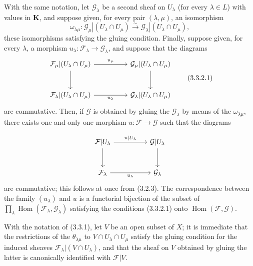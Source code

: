 \begin{env}[3.3.2]
\label{0.3.3.2}
With the same notation, let $\mathcal{G}_\lambda$ be a second sheaf on
$U_\lambda$ (for every $\lambda\in L$) with values in $\mathbf{K}$, and suppose
given, for every pair $(\lambda,\mu)$, an isomorphism
\[
  \omega_{\lambda\mu}:
  \mathcal{G}_\mu|(U_\lambda\cap U_\mu)
  \xrightarrow{\sim}
  \mathcal{G}_\lambda|(U_\lambda\cap U_\mu),
\]
these isomorphisms satisfying the gluing condition. Finally, suppose given,
for every $\lambda$, a morphism
$u_\lambda:\mathcal{F}_\lambda\to\mathcal{G}_\lambda$, and suppose that the diagrams
\begin{equation}
\begin{tikzcd}[column sep=huge,row sep=large]
\mathcal{F}_\mu|(U_\lambda\cap U_\mu)
  \arrow[r,"u_\mu"] \arrow[d]
  & \mathcal{G}_\mu|(U_\lambda\cap U_\mu) \arrow[d] \\
\mathcal{F}_\lambda|(U_\lambda\cap U_\mu)
  \arrow[r,"u_\lambda"']
  & \mathcal{G}_\lambda|(U_\lambda\cap U_\mu)
\end{tikzcd}
\tag{3.3.2.1}\label{0.3.3.2.1}
\end{equation}
are commutative. Then, if $\mathcal{G}$ is obtained by gluing the
$\mathcal{G}_\lambda$ by means of the $\omega_{\lambda\mu}$, there exists one and only one
morphism $u:\mathcal{F}\to\mathcal{G}$ such that the diagrams


\[
\begin{tikzcd}[column sep=huge,row sep=large]
\mathcal{F}|U_\lambda
  \arrow[r,"u|U_\lambda"] \arrow[d]
  & \mathcal{G}|U_\lambda \arrow[d] \\
\mathcal{F}_\lambda
  \arrow[r,"u_\lambda"']
  & \mathcal{G}_\lambda
\end{tikzcd}
\]
are commutative; this follows at once from (3.2.3). The correspondence between
the family $(u_\lambda)$ and $u$ is a functorial bijection of the subset of
$\prod_\lambda\operatorname{Hom}(\mathcal{F}_\lambda,\mathcal{G}_\lambda)$
satisfying the conditions (3.3.2.1) onto
$\operatorname{Hom}(\mathcal{F},\mathcal{G})$.
\end{env}

\begin{env}[3.3.3]
\label{0.3.3.3}
With the notation of (3.3.1), let $V$ be an open subset of $X$; it is immediate that
the restrictions of the $\theta_{\lambda\mu}$ to $V\cap U_\lambda\cap U_\mu$
satisfy the gluing condition for the induced sheaves
$\mathcal{F}_\lambda|(V\cap U_\lambda)$, and that the sheaf on $V$ obtained by
gluing the latter is canonically identified with $\mathcal{F}|V$.
\end{env}

